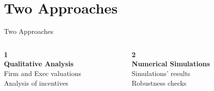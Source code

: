 \documentclass[compress]{beamer}
\begin{document}
\section{Two Approaches}
\begin{frame}{Two Approaches}
    \begin{columns}[c]
        \begin{column}{0.5\textwidth} 
            \centering
            \Huge \textbf{1}\\
            \large
            \vspace*{2pt}
            \textbf{Qualitative Analysis}\\
            \normalsize
            \vspace*{5pt}
            Firm and Exec valuations\\
            Analysis of incentives
        \end{column}
        \begin{column}{0.5\textwidth}
            \centering
            \Huge \textbf{2}\\
            \large
            \vspace*{2pt}
            \textbf{Numerical Simulations}\\
            \normalsize
            \vspace*{5pt}
            Simulations' results\\
            Robustness checks
        \end{column}
    \end{columns}
\end{frame}
\end{document}
